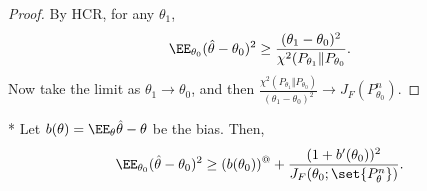 \begin{proof}
	By HCR, for any $\theta_1$, \[
		\EE_{\theta_0} (\hat \theta - \theta_0)^2 \geq \frac{(\theta_1 - \theta_0)^2}{\chi^2(P_{\theta_1} \Vert P_{\theta_0}}.
	\]
	Now take the limit as $\theta_1\to \theta_0$, and then $\frac{\chi^2(P_{\theta_1} \Vert P_{\theta_0})}{(\theta_1 - \theta_0)^2} \to J_F(P_{\theta_0}^n)$.
\end{proof}

\begin{cor}*
	Let $b(\theta) = \EE_{\theta} \hat \theta - \theta$ be the bias. Then, \[
		\EE_{\theta_0} (\hat \theta - \theta_0)^2 \geq (b(\theta_0))^@ + \frac{(1 + b'(\theta_0))^2}{J_F(\theta_0; \set{P_{\theta}^n})}.
	\]
\end{cor}



